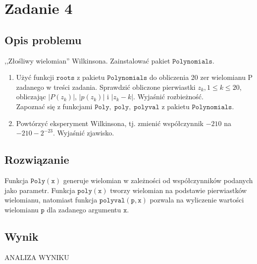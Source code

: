 \section{Zadanie 4}
\subsection{Opis problemu}
,,Złośliwy wielomian'' Wilkinsona. Zainstalować pakiet $ \mathtt{Polynomials} $.
\begin{enumerate}[label=(\alph*)]
  \item Użyć funkcji $ \mathtt{roots} $ z pakietu $ \mathtt{Polynomials} $ do obliczenia 20 zer wielomianu P zadanego w treści zadania. Sprawdzić obliczone pierwiastki $ z_k, 1 \leq k \leq 20 $, obliczając $|P(z_k)|$, $|p(z_k)|$ i $|z_k - k|$. Wyjaśnić rozbieżność. \\
  Zapoznać się z funkcjami $ \mathtt{Poly},\; \mathtt{poly},\; \mathtt{polyval}$ z pakietu $ \mathtt{Polynomials} $.
  \item Powtórzyć eksperyment Wilkinsona, tj. zmienić współczynnik $-210$ na $ -210-2^{-23}$. Wyjaśnić zjawisko.
\end{enumerate}
\subsection{Rozwiązanie}
Funkcja $ \mathtt{Poly(x)} $ generuje wielomian w zależności od współczynników podanych jako parametr.
Funkcja $ \mathtt{poly(x)} $ tworzy wielomian na podstawie pierwiastków wielomianu, natomiast funkcja $ \mathtt{polyval(p, x)} $ pozwala na wyliczenie wartości wielomianu $ \mathtt{p} $ dla zadanego argumentu $ \mathtt{x} $.
\subsection{Wynik}
\begin{center}
  
\end{center}

ANALIZA WYNIKU